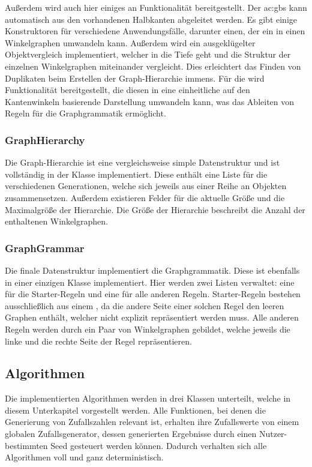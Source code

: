 Außerdem wird auch hier einiges an Funktionalität bereitgestellt. Der \gls{ac:gbs} kann automatisch aus den vorhandenen Halbkanten
abgeleitet werden. Es gibt einige Konstruktoren für verschiedene Anwendungsfälle, darunter einen, der ein  in
einen Winkelgraphen umwandeln kann. Außerdem wird ein ausgeklügelter Objektvergleich implementiert, welcher in die Tiefe geht und
die Struktur der einzelnen Winkelgraphen miteinander vergleicht. Dies erleichtert das Finden von Duplikaten beim Erstellen der
Graph-Hierarchie immens. Für die  wird Funktionalität bereitgestellt, die diesen in eine einheitliche auf den
Kantenwinkeln basierende Darstellung umwandeln kann, was das Ableiten von Regeln für die Graphgrammatik ermöglicht.

\subsubsection{GraphHierarchy}
Die Graph-Hierarchie ist eine vergleichsweise simple Datenstruktur und ist vollständig in der Klasse  implementiert.
Diese enthält eine Liste für die verschiedenen Generationen, welche sich jeweils aus einer Reihe an  Objekten
zusammensetzen. Außerdem existieren Felder für die aktuelle Größe und die Maximalgröße der Hierarchie. Die Größe der Hierarchie
beschreibt die Anzahl der enthaltenen Winkelgraphen.

\subsubsection{GraphGrammar}
Die finale Datenstruktur implementiert die Graphgrammatik. Diese ist ebenfalls in einer einzigen Klasse  implementiert.
Hier werden zwei Listen verwaltet: eine für die Starter-Regeln und eine für alle anderen Regeln. Starter-Regeln bestehen ausschließlich
aus einem , da die andere Seite einer solchen Regel den leeren Graphen enthält, welcher nicht explizit repräsentiert
werden muss. Alle anderen Regeln werden durch ein Paar von Winkelgraphen gebildet, welche jeweils die linke und die rechte Seite der
Regel repräsentieren. 

\subsection{Algorithmen}
Die implementierten Algorithmen werden in drei Klassen unterteilt, welche in diesem Unterkapitel vorgestellt werden. Alle Funktionen,
bei denen die Generierung von Zufallszahlen relevant ist, erhalten ihre Zufallswerte von einem globalen Zufallsgenerator, dessen
generierten Ergebnisse durch einen Nutzer-bestimmten Seed gesteuert werden können. Dadurch verhalten sich alle Algorithmen voll
und ganz deterministisch.

